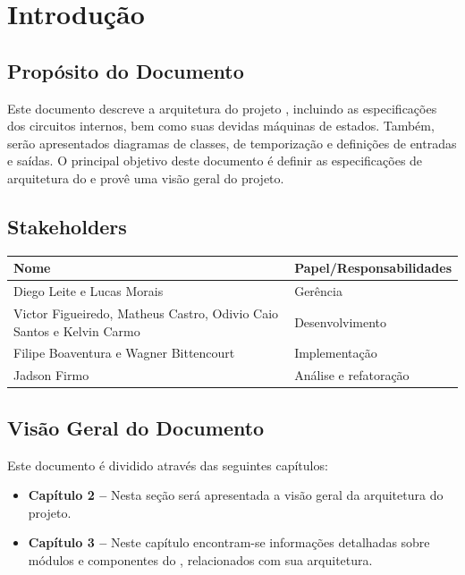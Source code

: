 \documentclass{report}
\begin{document}
\chapter{Introdução}
  
  \section{Propósito do Documento}
  Este documento descreve a arquitetura do projeto \ipPROCESSProject, incluindo as especificações dos circuitos internos, bem como suas devidas máquinas de estados. Também, serão apresentados diagramas de classes, de temporização e definições de entradas e saídas. O principal objetivo deste documento é definir as especificações de arquitetura do \ipPROCESSProject \space e provê uma visão geral do projeto.
  
  \section{Stakeholders}
    \FloatBarrier
    \begin{table}[H] 
      \begin{center}
        \begin{tabular}[pos]{|m{6cm} | m{8cm}|} 
          \hline 
          \cellcolor[gray]{0.9}\textbf{Nome} & \cellcolor[gray]{0.9}\textbf{Papel/Responsabilidades} \\ \hline
           Diego Leite e Lucas Morais & Gerência  \\ \hline
           Victor Figueiredo, Matheus Castro, Odivio Caio Santos e Kelvin Carmo & Desenvolvimento  \\ \hline
           Filipe Boaventura e Wagner Bittencourt & Implementação  \\ \hline
           Jadson Firmo & Análise e refatoração  \\ \hline
        \end{tabular}
      \end{center}
    \end{table} 

\section{Visão Geral do Documento}

Este documento é dividido através das seguintes capítulos:

  \begin{itemize}
  	\item \textbf{Capítulo 2 --} Nesta seção será apresentada a visão geral da arquitetura do projeto.
  	\item \textbf{Capítulo 3 --} Neste capítulo encontram-se informações detalhadas sobre módulos e componentes do \ipPROCESSProject, relacionados com sua arquitetura.
  \end{itemize}
\end{document}
